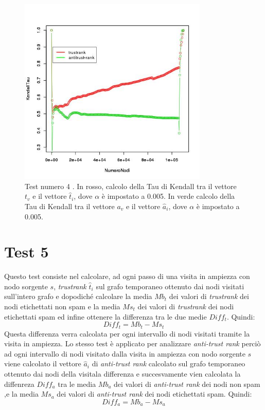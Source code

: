 \begin{figure}
 \centering
 \includegraphics[height=9cm]{immagini/test4/coplotTrustAnti_Mode1_set3776_62_alpha0005}
  \caption{Test numero 4 . In rosso, calcolo della Tau di Kendall tra il vettore $t_v$ e il vettore $\hat{t}_i$, dove $\alpha$ è impostato a 0.005. In verde calcolo della Tau di Kendall tra il vettore $a_v$ e il vettore $\hat{a}_i$, dove $\alpha$ è impostato a 0.005.}
 \label{fig:test4coplotTrustAntiModeB620005}
\end{figure}


\section{Test 5}
Questo test consiste nel calcolare, ad ogni passo di una visita in ampiezza  con nodo sorgente \(s\), \textit{trustrank} \(\hat{t}_i\) sul grafo temporaneo ottenuto dai nodi visitati sull'intero grafo e dopodiché calcolare la media \(Mb_t\) dei valori di \textit{trustrank} dei nodi etichettati non spam e la media \(Ms_t\) dei valori di \textit{trustrank} dei nodi etichettati spam ed infine ottenere la differenza tra le due medie \(Diff_t\). Quindi:
\begin{equation}
 Diff_t = Mb_t-Ms_t
\end{equation}
Questa differenza verra calcolata per ogni intervallo di nodi visitati tramite la visita in ampiezza. Lo stesso test è applicato per analizzare \textit{anti-trust rank} perciò ad ogni intervallo di nodi visitato  dalla visita in ampiezza con nodo sorgente \(s\) viene calcolato il vettore \(\hat{a}_i\)  di \textit{anti-trust rank}  calcolato sul grafo temporaneo ottenuto dai nodi della visitala differenza e succesvamente vien calcolata la diffenreza \(Diff_a\) tra le media \(Mb_a\) dei valori di \textit{anti-trust rank} dei nodi non spam ,e la media \(Ms_a\) dei valori di \textit{anti-trust rank} dei nodi etichettati spam. Quindi:
\begin{equation}
 Diff_a=Mb_a-Ms_a
\end{equation}

